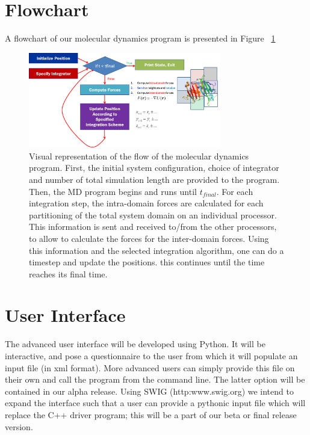 \documentclass[10pt]{article}
\begin{document}
\section{Flowchart}
A flowchart of our molecular dynamics program is presented in Figure ~\ref{fig:flowchart}
\begin{figure}
\centering
\includegraphics[width=0.75\textwidth]{flowchart.png}
\caption{Visual representation of the flow of the molecular dynamics program. First, the initial system configuration, choice of integrator and number of total simulation length are provided to the program. Then, the MD program begins and runs until $t_{final}$. For each integration step, the intra-domain forces are calculated for each partitioning of the total system domain on an individual processor. This information is sent and received to/from the other processors, to allow to calculate the forces for the inter-domain forces. Using this information and the selected integration algorithm, one can do a timestep and update the positions. this continues until the time reaches its final time.}
\label{fig:flowchart}
\end{figure}


\section{User Interface}
The advanced user interface will be developed using Python. It will be interactive, and pose a questionnaire to the user from which it will populate an input file (in xml format).  More advanced users can simply provide this file on their own and call the program from the command line.  The latter option will be contained in our alpha release.  Using SWIG (http:www.swig.org) we intend to expand the interface such that a user can provide a pythonic input file which will replace the C++ driver program; this will be a part of our beta or final release version.
\end{document}
